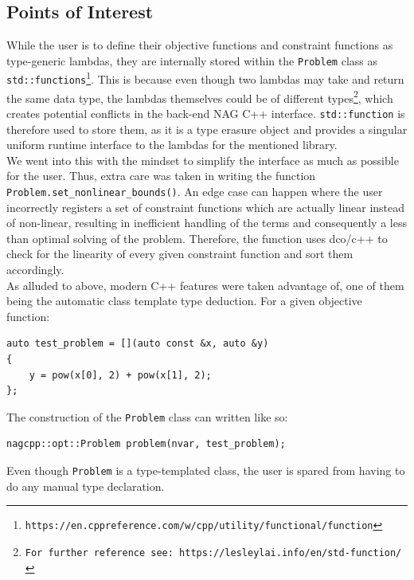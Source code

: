 \documentclass{book}
\begin{document}
\subsection{Points of Interest}
While the user is to define their objective functions and constraint functions as type-generic lambdas, they are internally stored within the \texttt{Problem} class as \texttt{std::functions}\footnote{\tt https://en.cppreference.com/w/cpp/utility/functional/function}. This is because even though two lambdas may take and return the same data type, the lambdas themselves could be of different types\footnote{\tt For further reference see: https://lesleylai.info/en/std-function/}, which creates potential conflicts in the back-end NAG C++ interface. \texttt{std::function} is therefore used to store them, as it is a type erasure object and provides a singular uniform runtime interface to the lambdas for the mentioned library. \\
\newline
We went into this with the mindset to simplify the interface as much as possible for the user. Thus, extra care was taken in writing the function\\ \texttt{Problem.set\_nonlinear\_bounds()}. An edge case can happen where the user incorrectly registers a set of constraint functions which are actually linear instead of non-linear, resulting in inefficient handling of the terms and consequently a less than optimal solving of the problem. Therefore, the function uses dco/c++ to check for the linearity of every given constraint function and sort them accordingly.\\
\newline
As alluded to above, modern C++ features were taken advantage of, one of them being the automatic class template type deduction. For a given objective function: 
\begin{lstlisting}[basicstyle=\normalsize]
auto test_problem = [](auto const &x, auto &y)
{
    y = pow(x[0], 2) + pow(x[1], 2);
};
\end{lstlisting}

The construction of the \texttt{Problem} class can written like so: 
\begin{lstlisting}[basicstyle=\normalsize]
nagcpp::opt::Problem problem(nvar, test_problem);
\end{lstlisting}

Even though \texttt{Problem} is a type-templated class, the user is spared from having to do any manual type declaration.
\end{document}
